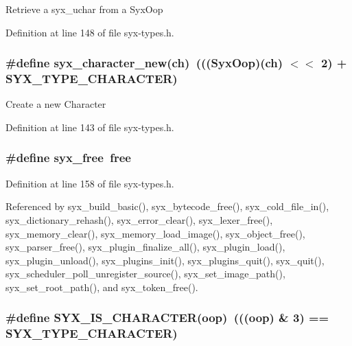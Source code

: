 Retrieve a syx\_\-uchar from a SyxOop 

Definition at line 148 of file syx-types.h.\hypertarget{syx-types_8h_7f419887cd49c9167b1d79a701afa9b4}{
\subsubsection{\setlength{\rightskip}{0pt plus 5cm}\#define syx\_\-character\_\-new(ch)~((({\bf SyxOop})(ch) $<$$<$ 2) + SYX\_\-TYPE\_\-CHARACTER)}}
\label{syx-types_8h_7f419887cd49c9167b1d79a701afa9b4}


Create a new Character 

Definition at line 143 of file syx-types.h.\hypertarget{syx-types_8h_1659cf99572438c55385f05f6a090d03}{
\subsubsection{\setlength{\rightskip}{0pt plus 5cm}\#define syx\_\-free~free}}
\label{syx-types_8h_1659cf99572438c55385f05f6a090d03}




Definition at line 158 of file syx-types.h.

Referenced by syx\_\-build\_\-basic(), syx\_\-bytecode\_\-free(), syx\_\-cold\_\-file\_\-in(), syx\_\-dictionary\_\-rehash(), syx\_\-error\_\-clear(), syx\_\-lexer\_\-free(), syx\_\-memory\_\-clear(), syx\_\-memory\_\-load\_\-image(), syx\_\-object\_\-free(), syx\_\-parser\_\-free(), syx\_\-plugin\_\-finalize\_\-all(), syx\_\-plugin\_\-load(), syx\_\-plugin\_\-unload(), syx\_\-plugins\_\-init(), syx\_\-plugins\_\-quit(), syx\_\-quit(), syx\_\-scheduler\_\-poll\_\-unregister\_\-source(), syx\_\-set\_\-image\_\-path(), syx\_\-set\_\-root\_\-path(), and syx\_\-token\_\-free().\hypertarget{syx-types_8h_519a5430d5368974ee1ec05b10b11edf}{
\subsubsection{\setlength{\rightskip}{0pt plus 5cm}\#define SYX\_\-IS\_\-CHARACTER(oop)~(((oop) \& 3) == SYX\_\-TYPE\_\-CHARACTER)}}
\label{syx-types_8h_519a5430d5368974ee1ec05b10b11edf}




